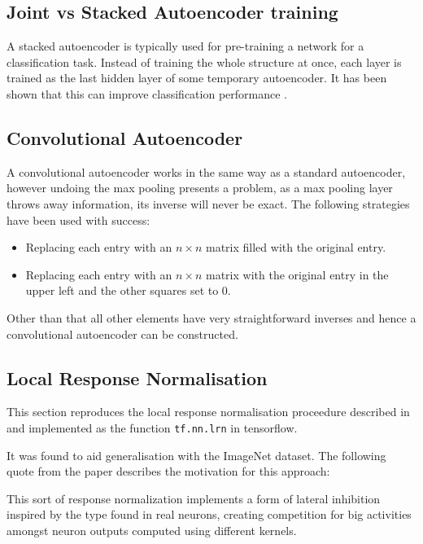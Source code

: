   \subsection{Joint vs Stacked Autoencoder training}
    A stacked autoencoder is typically used for pre-training a network for a classification task.
    Instead of training the whole structure at once, each layer is trained as the last hidden
    layer of some temporary autoencoder. It has been shown that this can improve classification performance \cite{stacks}.
  \subsection{Convolutional Autoencoder}
    A convolutional autoencoder works in the same way as a standard autoencoder, however
    undoing the max pooling presents a problem, as a max pooling layer throws away
    information, its inverse will never be exact. The following strategies have been
    used with success:
    \begin{itemize}
      \item Replacing each entry with an $n \times n$ matrix filled with the original
      entry.
      \item Replacing each entry with an  $n\times n$  matrix with
      the original entry in the upper left and the other squares set to 0. \cite{Dosovitskiy2015}
    \end{itemize}

    Other than that all other elements have very straightforward inverses and hence
    a convolutional autoencoder can be constructed.
  \subsection{Local Response Normalisation} \label{sec:lrn}
    This section reproduces the local response normalisation proceedure described in \cite{Krizhevsky2012}
    and implemented as the function \texttt{tf.nn.lrn} in tensorflow.

    It was found to aid generalisation with the ImageNet dataset. The following quote from the paper \cite{Krizhevsky2012}
    describes the motivation for this approach:

    \begin{displayquote}
      This sort of response normalization implements a form of lateral inhibition
      inspired by the type found in real neurons, creating competition for big activities amongst neuron
      outputs computed using different kernels.
    \end{displayquote}

